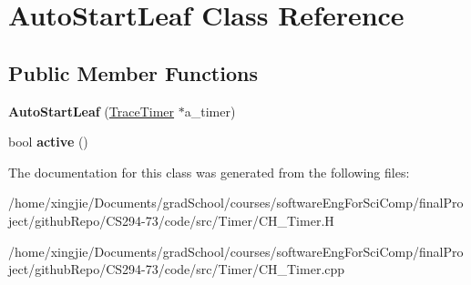 \hypertarget{classAutoStartLeaf}{}\section{Auto\+Start\+Leaf Class Reference}
\label{classAutoStartLeaf}
\subsection*{Public Member Functions}
\begin{DoxyCompactItemize}
\item 
\hypertarget{classAutoStartLeaf_ad31126dbec37c0245fd08bb77be1612b}{}{\bfseries Auto\+Start\+Leaf} (\hyperlink{classTraceTimer}{Trace\+Timer} $\ast$a\+\_\+timer)\label{classAutoStartLeaf_ad31126dbec37c0245fd08bb77be1612b}

\item 
\hypertarget{classAutoStartLeaf_ac6ebea5f14cfea49095514d89f107691}{}bool {\bfseries active} ()\label{classAutoStartLeaf_ac6ebea5f14cfea49095514d89f107691}

\end{DoxyCompactItemize}


The documentation for this class was generated from the following files\+:\begin{DoxyCompactItemize}
\item 
/home/xingjie/\+Documents/grad\+School/courses/software\+Eng\+For\+Sci\+Comp/final\+Project/github\+Repo/\+C\+S294-\/73/code/src/\+Timer/C\+H\+\_\+\+Timer.\+H\item 
/home/xingjie/\+Documents/grad\+School/courses/software\+Eng\+For\+Sci\+Comp/final\+Project/github\+Repo/\+C\+S294-\/73/code/src/\+Timer/C\+H\+\_\+\+Timer.\+cpp\end{DoxyCompactItemize}
